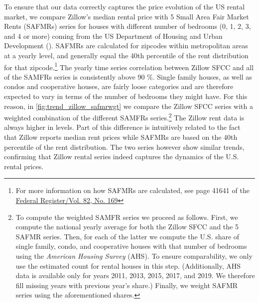 To ensure that our data correctly captures the price evolution of the US rental market, we compare 
Zillow's median rental price with 5 Small Area Fair Market Rents (SAFMRs) series for houses with 
different number of bedrooms (0, 1, 2, 3, and 4 or more) coming from the US Department of Housing and 
Urban Development (\citeyear{hud}). SAFMRs are calculated for zipcodes within metropolitan areas at a 
yearly level, and generally equal the 40th percentile of the rent distribution for that 
zipcode.\footnote{For more information on how SAFMRs are calculated, see page 41641 of the 
	\href{https://www.huduser.gov/portal/datasets/fmr/fmr2018/FY2018-FMR-Preamble.pdf}
	{Federal Register/Vol. 82, No. 169}} 
The yearly time series correlation between Zillow SFCC and all of the SAMFRs series is consistently 
above 90 \%. Single family houses, as well as condos and cooperative houses, are fairly loose 
categories and are therefore expected to vary in terms of the number of bedrooms they might have. For 
this reason, in \autoref{fig:trend_zillow_safmrwgt} we compare the Zillow SFCC series with a weighted 
combination of the different SAMFRs series.\footnote{To compute the weighted SAMFR series we proceed 
	as follows. First, we compute the national yearly average for both the Zillow SFCC and the 5 
	SAFMR series. Then, for each of the latter we compute the U.S. share of single family, condo, 
	and cooperative houses with that number of bedrooms using the \textit{American Housing Survey} 
	(AHS). To ensure comparability, we only use the estimated count for rental houses in this step. 
	(Additionally, AHS data is available only for years 2011, 2013, 2015, 2017, and 2019. We therefore 
	fill missing years with previous year's share.) Finally, we weight SAFMR series using the 
	aforementioned shares.} 
The Zillow rent data is always higher in levels. Part of this difference is intuitively related to the 
fact that Zillow reports median rent prices while SAFMRs are based on the 40th percentile of the rent 
distribution. The two series however show similar trends, confirming that Zillow rental series indeed 
captures the dynamics of the U.S. rental prices.


